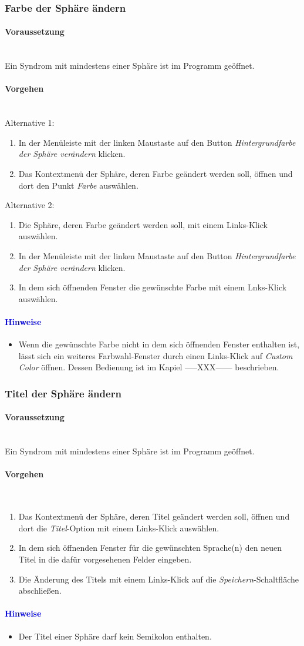 \documentclass[enabledeprecatedfontcommands,fontsize=11pt,paper=a4,twoside]{scrartcl}
\newcommand*{\hint}{\paragraph{\textcolor{blue}{Hinweise}}}
\newcommand*{\condition}{\paragraph{Voraussetzung}$\;$ \vspace{0.2cm}\\}
\newcommand*{\actions}{\paragraph{Vorgehen} $\;$\vspace{0.2cm}\\}
\begin{document}
		\subsubsection{Farbe der Sphäre ändern}
				\condition 	
		Ein Syndrom mit mindestens einer Sphäre ist im Programm geöffnet. 
		\actions  
		Alternative 1:
		\begin{enumerate}
			\item In der Menüleiste mit der linken Maustaste auf den Button \textit{Hintergrundfarbe der Sphäre verändern} klicken.
			\item Das Kontextmenü der Sphäre, deren Farbe geändert werden soll, öffnen und dort den Punkt \textit{Farbe} auswählen.
		\end{enumerate}
		Alternative 2:
		\begin{enumerate}
			\item Die Sphäre, deren Farbe geändert werden soll, mit einem Links-Klick auswählen.
			\item In der Menüleiste mit der linken Maustaste auf den Button \textit{Hintergrundfarbe der Sphäre verändern} klicken.
			\item In dem sich öffnenden Fenster die gewünschte Farbe mit einem Lnks-Klick auswählen.
		\end{enumerate}
		\hint
		\begin{itemize}
			\item Wenn die gewünschte Farbe nicht in dem sich öffnenden Fenster enthalten ist, lässt sich ein weiteres Farbwahl-Fenster durch einen Links-Klick auf \textit{Custom Color} öffnen. Dessen Bedienung ist im Kapiel -----XXX------ beschrieben.
	\end{itemize}	
	
			\newpage	
	\subsubsection{Titel der Sphäre ändern}
				\condition 	
		Ein Syndrom mit mindestens einer Sphäre ist im Programm geöffnet. 
		\actions  
		\begin{enumerate}
			\item Das Kontextmenü der Sphäre, deren Titel geändert werden soll, öffnen und dort die \textit{Titel}-Option mit einem Links-Klick auswählen. 
			\item In dem sich öffnenden Fenster für die gewünschten Sprache(n) den neuen Titel in die dafür vorgesehenen Felder eingeben.
			\item Die Änderung des Titels mit einem Links-Klick auf die \textit{Speichern}-Schaltfläche abschließen.
		\end{enumerate}
		\hint
		\begin{itemize}
			\item Der Titel einer Sphäre darf kein Semikolon enthalten.
		\end{itemize}
\end{document}
